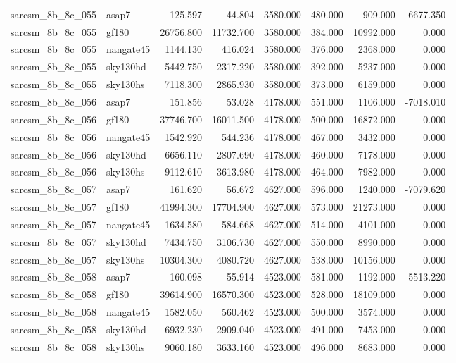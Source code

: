 \begin{tabular}{llrrrrrr}
sarcsm\_8b\_8c\_055 & asap7 & 125.597 & 44.804 & 3580.000 & 480.000 & 909.000 & -6677.350 \\
sarcsm\_8b\_8c\_055 & gf180 & 26756.800 & 11732.700 & 3580.000 & 384.000 & 10992.000 & 0.000 \\
sarcsm\_8b\_8c\_055 & nangate45 & 1144.130 & 416.024 & 3580.000 & 376.000 & 2368.000 & 0.000 \\
sarcsm\_8b\_8c\_055 & sky130hd & 5442.750 & 2317.220 & 3580.000 & 392.000 & 5237.000 & 0.000 \\
sarcsm\_8b\_8c\_055 & sky130hs & 7118.300 & 2865.930 & 3580.000 & 373.000 & 6159.000 & 0.000 \\
sarcsm\_8b\_8c\_056 & asap7 & 151.856 & 53.028 & 4178.000 & 551.000 & 1106.000 & -7018.010 \\
sarcsm\_8b\_8c\_056 & gf180 & 37746.700 & 16011.500 & 4178.000 & 500.000 & 16872.000 & 0.000 \\
sarcsm\_8b\_8c\_056 & nangate45 & 1542.920 & 544.236 & 4178.000 & 467.000 & 3432.000 & 0.000 \\
sarcsm\_8b\_8c\_056 & sky130hd & 6656.110 & 2807.690 & 4178.000 & 460.000 & 7178.000 & 0.000 \\
sarcsm\_8b\_8c\_056 & sky130hs & 9112.610 & 3613.980 & 4178.000 & 464.000 & 7982.000 & 0.000 \\
sarcsm\_8b\_8c\_057 & asap7 & 161.620 & 56.672 & 4627.000 & 596.000 & 1240.000 & -7079.620 \\
sarcsm\_8b\_8c\_057 & gf180 & 41994.300 & 17704.900 & 4627.000 & 573.000 & 21273.000 & 0.000 \\
sarcsm\_8b\_8c\_057 & nangate45 & 1634.580 & 584.668 & 4627.000 & 514.000 & 4101.000 & 0.000 \\
sarcsm\_8b\_8c\_057 & sky130hd & 7434.750 & 3106.730 & 4627.000 & 550.000 & 8990.000 & 0.000 \\
sarcsm\_8b\_8c\_057 & sky130hs & 10304.300 & 4080.720 & 4627.000 & 538.000 & 10156.000 & 0.000 \\
sarcsm\_8b\_8c\_058 & asap7 & 160.098 & 55.914 & 4523.000 & 581.000 & 1192.000 & -5513.220 \\
sarcsm\_8b\_8c\_058 & gf180 & 39614.900 & 16570.300 & 4523.000 & 528.000 & 18109.000 & 0.000 \\
sarcsm\_8b\_8c\_058 & nangate45 & 1582.050 & 560.462 & 4523.000 & 500.000 & 3574.000 & 0.000 \\
sarcsm\_8b\_8c\_058 & sky130hd & 6932.230 & 2909.040 & 4523.000 & 491.000 & 7453.000 & 0.000 \\
sarcsm\_8b\_8c\_058 & sky130hs & 9060.180 & 3633.160 & 4523.000 & 496.000 & 8683.000 & 0.000 \\

\end{tabular}
